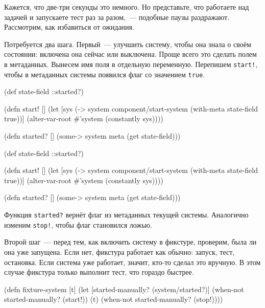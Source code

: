 Кажется, что две-три секунды это немного. Но представьте, что работаете над
задачей и запускаете тест раз за разом,~--- подобные паузы
раздражают. Рассмотрим, как избавиться от ожидания.


Потребуется два шага. Первый~--- улучшить систему, чтобы она знала о своём
состоянии: включена она сейчас или выключена. Проще всего это сделать полем в
метаданных. Вынесем имя поля в отдельную переменную. Перепишем \verb|start!|,
чтобы в метаданных системы появился флаг со значением \verb|true|.

\ifnarrow

\begin{english}
  \begin{clojure}
(def state-field ::started?)

(defn start! []
  (let [sys
        (-> system
            component/start-system
            (with-meta
              {state-field true}))]
    (alter-var-root
      #'system (constantly sys))))

(defn started? []
  (some-> system meta (get state-field)))
  \end{clojure}
\end{english}

\else

\begin{english}
  \begin{clojure}
(def state-field ::started?)

(defn start! []
  (let [sys (-> system
                component/start-system
                (with-meta {state-field true}))]
    (alter-var-root #'system (constantly sys))))

(defn started? []
  (some-> system meta (get state-field)))
  \end{clojure}
\end{english}

\fi

Функция \verb|started?| вернёт флаг из метаданных текущей системы. Аналогично
изменим \verb|stop!|, чтобы флаг становился ложью.

Второй шаг~--- перед тем, как включить систему в фикстуре, проверим, была ли она
уже запущена. Если нет, фикстура работает как обычно: запуск, тест,
остановка. Если система уже работает, значит, кто-то сделал это вручную. В этом
случае фикстура только выполнит тест, что гораздо быстрее.

\ifnarrow

\begin{english}
  \begin{clojure}
(defn fixture-system [t]
  (let [started-manually?
        (system/started?)]
    (when-not started-manually?
      (start!))
    (t)
    (when-not started-manually?
      (stop!))))
  \end{clojure}
\end{english}


